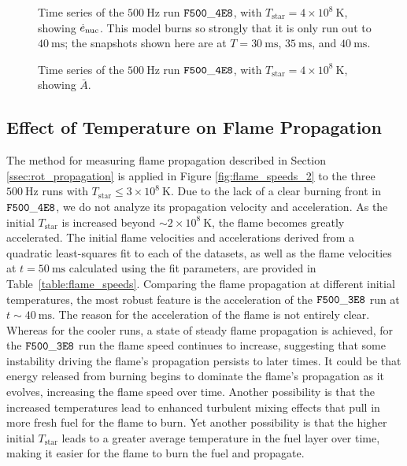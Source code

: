\documentclass[preprint,times,tighten]{aastex63}
\newcommand{\enucdot}{\dot{e}_{\rm nuc}}
\begin{document}
\begin{figure}[t]
	\centering
	\caption{\label{fig:4e8_stacked_enuc} Time series of the $500~\mathrm{Hz}$ run $\tt{F500\_4E8}$, with $T_{\mathrm{star}} = 4 \times 10^8~\mathrm{K}$, showing $\enucdot$. This model burns so strongly that it is only run out to $40~\mathrm{ms}$; the snapshots shown here are at $T = 30~\mathrm{ms}$, $35~\mathrm{ms}$, and $40~\mathrm{ms}$.}
\end{figure}

\begin{figure}[t]
	\centering
	\caption{\label{fig:4e8_stacked_abar} Time series of the $500~\mathrm{Hz}$ run $\tt{F500\_4E8}$, with $T_{\mathrm{star}} = 4 \times 10^8~\mathrm{K}$, showing $\bar{A}$.}
\end{figure}


\subsection{Effect of Temperature on Flame Propagation}\label{ssec:temp_prop}

The method for measuring flame propagation described in Section \ref{ssec:rot_propagation} is 
applied in Figure \ref{fig:flame_speeds_2} to the three $500~\mathrm{Hz}$ runs with 
$T_{\mathrm{star}} \leq 3 \times 10^8~\mathrm{K}$. Due to the lack of a clear burning front in 
$\tt{F500\_4E8}$, we do not analyze its propagation velocity and acceleration. As the initial 
$T_{\mathrm{star}}$ is increased beyond $\sim 2\times 10^8~\mathrm{K}$, the flame becomes greatly accelerated. The initial flame 
velocities and accelerations derived from a quadratic least-squares fit to each of the datasets, as 
well as the flame velocities at $t = 50~\mathrm{ms}$ calculated using the fit parameters, are 
provided in Table~\ref{table:flame_speeds}. Comparing the flame propagation at different initial 
temperatures, the most robust feature is the acceleration of the $\tt{F500\_3E8}$ run at $t \sim 
40~\mathrm{ms}$. The reason for the acceleration of the flame is not entirely clear. 
Whereas for the cooler runs, a state of steady flame propagation is achieved, for the $\tt{F500\_3E8}$ run
the flame speed continues to increase, suggesting that some instability driving the 
flame's propagation persists to later times. It could be 
that energy released from burning begins to dominate the flame's propagation as it evolves, 
increasing the flame speed over time. Another possibility is that the increased temperatures lead 
to enhanced turbulent mixing effects that pull in more fresh fuel for the flame to burn. Yet 
another possibility is that the higher initial $T_{\mathrm{star}}$ leads to a greater average 
temperature in the fuel layer over time, making it easier for the flame to burn the fuel and 
propagate. 
\end{document}
